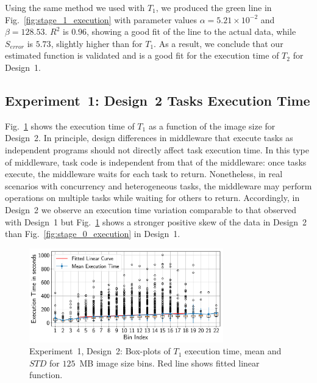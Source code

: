 Using the same method we used with $T_{1}$, we produced the green line in
Fig.~\ref{fig:stage_1_execution} with parameter values
$\alpha = 5.21 \times 10^{-2}$ and $\beta = 128.53$. $R^{2}$ is $0.96$,
showing a good fit of the line to the actual data, while $S_{error}$ is
$5.73$, slightly higher than for $T_{1}$. As a result, we conclude that our
estimated function is validated and is a good fit for the execution time of
$T_{2}$ for Design~1.

\subsection{Experiment~1: Design~2 Tasks Execution Time}
\label{ssec:des2analysis}
Fig.~\ref{fig:stage_1_execution_des2} shows the execution time of $T_{1}$ as a
function of the image size for Design~2. In principle, design differences in
middleware that execute tasks as independent programs should not directly
affect task execution time. In this type of middleware, task code is
independent from that of the middleware: once tasks execute, the middleware
waits for each task to return. Nonetheless, in real scenarios with concurrency
and heterogeneous tasks, the middleware may perform operations on multiple
tasks while waiting for others to return. Accordingly, in Design~2 we observe
an execution time variation comparable to that observed with Design~1 but
Fig.~\ref{fig:stage_1_execution_des2} shows a stronger positive skew of the
data in Design~2 than Fig.~\ref{fig:stage_0_execution} in Design~1.

\begin{figure}[t]
    \centering
    \includegraphics[width=0.75\textwidth]{figures/designs/stage_0_tx_box_des2.pdf}
    \caption{Experiment~1, Design~2: Box-plots of $T_{1}$ execution time, mean
    and $STD$ for $125$~MB image size bins. Red line shows fitted linear
    function.}
    \label{fig:stage_1_execution_des2}
\end{figure}

